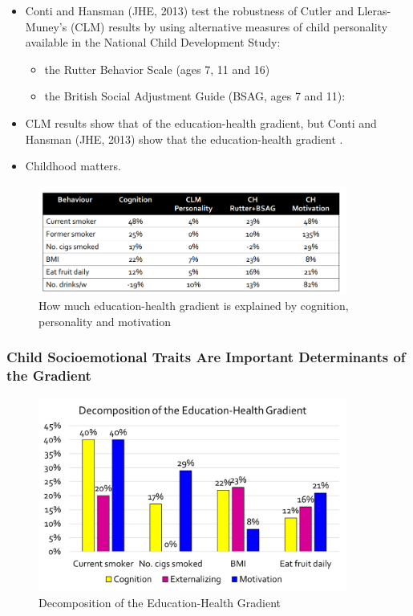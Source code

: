 \begin{enumerate}
\begin{itemize} 
        \item Conti and Hansman (JHE, 2013) test the robustness of Cutler and Lleras-Muney's (CLM) results by using alternative measures of child personality available in the National Child Development Study:
\begin{itemize}
        \item the Rutter Behavior Scale (ages 7, 11 and 16)
        \item the British Social Adjustment Guide (BSAG, ages 7 and 11):
\end{itemize}
        \item CLM results show that  of the education-health gradient, but Conti and Hansman (JHE, 2013) show that  the education-health gradient . 
        \item Childhood matters.
\end{itemize}
\begin{figure}[H]%
                \centering
                \includegraphics[width=4in]{images/ch3/42.png}
                \caption{How much education-health gradient is explained by cognition, personality and motivation}
            \end{figure} 
\end{enumerate}


\subsubsection{Child Socioemotional Traits Are Important Determinants of the Gradient}
\begin{figure}[H]%
                \centering
                \includegraphics[width=4in]{images/ch3/43.png}
                \caption{Decomposition of the Education-Health Gradient}
            \end{figure} 

